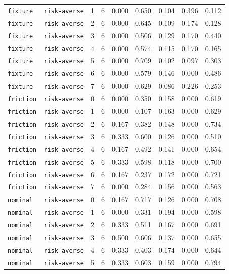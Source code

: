 \documentclass{article}
\begin{document}
\begin{center}
\begin{tabular}{lllcccccc}
\texttt{fixture} & \texttt{risk-averse} & 1 & 6 & 0.000 & 0.650 & 0.104 & 0.396 & 0.112 \\
\texttt{fixture} & \texttt{risk-averse} & 2 & 6 & 0.000 & 0.645 & 0.109 & 0.174 & 0.128 \\
\texttt{fixture} & \texttt{risk-averse} & 3 & 6 & 0.000 & 0.506 & 0.129 & 0.170 & 0.440 \\
\texttt{fixture} & \texttt{risk-averse} & 4 & 6 & 0.000 & 0.574 & 0.115 & 0.170 & 0.165 \\
\texttt{fixture} & \texttt{risk-averse} & 5 & 6 & 0.000 & 0.709 & 0.102 & 0.097 & 0.303 \\
\texttt{fixture} & \texttt{risk-averse} & 6 & 6 & 0.000 & 0.579 & 0.146 & 0.000 & 0.486 \\
\texttt{fixture} & \texttt{risk-averse} & 7 & 6 & 0.000 & 0.629 & 0.086 & 0.226 & 0.253 \\
\texttt{friction} & \texttt{risk-averse} & 0 & 6 & 0.000 & 0.350 & 0.158 & 0.000 & 0.619 \\
\texttt{friction} & \texttt{risk-averse} & 1 & 6 & 0.000 & 0.107 & 0.163 & 0.000 & 0.629 \\
\texttt{friction} & \texttt{risk-averse} & 2 & 6 & 0.167 & 0.382 & 0.148 & 0.000 & 0.734 \\
\texttt{friction} & \texttt{risk-averse} & 3 & 6 & 0.333 & 0.600 & 0.126 & 0.000 & 0.510 \\
\texttt{friction} & \texttt{risk-averse} & 4 & 6 & 0.167 & 0.492 & 0.141 & 0.000 & 0.654 \\
\texttt{friction} & \texttt{risk-averse} & 5 & 6 & 0.333 & 0.598 & 0.118 & 0.000 & 0.700 \\
\texttt{friction} & \texttt{risk-averse} & 6 & 6 & 0.167 & 0.237 & 0.172 & 0.000 & 0.721 \\
\texttt{friction} & \texttt{risk-averse} & 7 & 6 & 0.000 & 0.284 & 0.156 & 0.000 & 0.563 \\
\texttt{nominal} & \texttt{risk-averse} & 0 & 6 & 0.167 & 0.717 & 0.126 & 0.000 & 0.708 \\
\texttt{nominal} & \texttt{risk-averse} & 1 & 6 & 0.000 & 0.331 & 0.194 & 0.000 & 0.598 \\
\texttt{nominal} & \texttt{risk-averse} & 2 & 6 & 0.333 & 0.511 & 0.167 & 0.000 & 0.691 \\
\texttt{nominal} & \texttt{risk-averse} & 3 & 6 & 0.500 & 0.606 & 0.137 & 0.000 & 0.655 \\
\texttt{nominal} & \texttt{risk-averse} & 4 & 6 & 0.333 & 0.403 & 0.174 & 0.000 & 0.644 \\
\texttt{nominal} & \texttt{risk-averse} & 5 & 6 & 0.333 & 0.603 & 0.159 & 0.000 & 0.794 \\
\bottomrule
\end{tabular}
\end{center}
\end{document}
